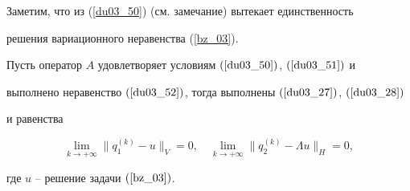Заметим, что из (\ref{du03_50}) (см. замечание) вытекает единственность 


решения вариационного неравенства (\ref{bz_03}).








\begin{thm} \label{bz_T7}


Пусть оператор $A$ удовлетворяет условиям $(\ref{du03_50})$, $(\ref{du03_51})$ и


выполнено неравенство $(\ref{du03_52})$, тогда выполнены $(\ref{du03_27})$, $(\ref{du03_28})$ 


и равенства


\begin{equation}


\lim_{k \to+\infty} \| q_1^{(k)}-u \|_V =0 ,\quad 


\lim_{k \to+\infty} \| q_2^{(k)}-\Lambda u \|_H =0 ,


\label{du03_55}


\end{equation}


где $u$ -- решение задачи $(\ref{bz_03})$.


\end{thm}








